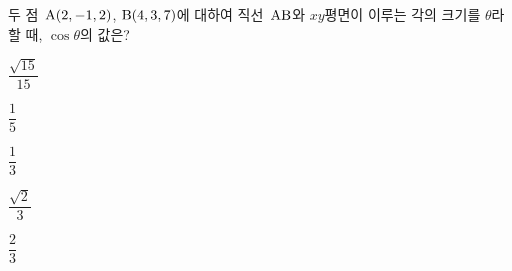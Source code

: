 두 점~$\mathrm{A}(2{,}\mkern3mu\mathopen{}-1{,}\mkern3mu\mathopen{}2)$, $\mathrm{B}(4{,}\mkern3mu\mathopen{}3{,}\mkern3mu\mathopen{}7)$에 대하여 직선~$\mathrm{AB}$와 $xy$평면이 이루는 각의 크기를 $\theta$라 할 때, $\cos\theta$의 값은?
\begin{choices32}{\rule[-3ex]{0pt}{8ex}$\dfrac{\sqrt{15}}{15}$}{\rule[-3ex]{0pt}{8ex}$\dfrac{1}{5}$}{\rule[-3ex]{0pt}{8ex}$\dfrac{1}{3}$}{\rule[-3ex]{0pt}{8ex}$\dfrac{\sqrt{2}}{3}$}{\rule[-3ex]{0pt}{8ex}$\dfrac{2}{3}$}\end{choices32}
